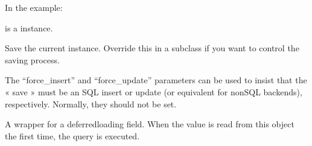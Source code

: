 \documentclass[letterpaper,10pt,french]{sphinxmanual}
\begin{document}
\begin{fulllineitems}
\begin{fulllineitems}
\sphinxAtStartPar
In the example:

\begin{sphinxVerbatim}[commandchars=\\\{\}]
 
       
\end{sphinxVerbatim}

\sphinxAtStartPar
{} is a  instance.

\end{fulllineitems}


\begin{fulllineitems}
\label{\detokenize{main/model:main.models.Conge.personnel_id}}
\pysigstartsignatures
{}
\pysigstopsignatures
\end{fulllineitems}


\begin{fulllineitems}
\label{\detokenize{main/model:main.models.Conge.save}}
\pysigstartsignatures
{}
\pysigstopsignatures
\sphinxAtStartPar
Save the current instance. Override this in a subclass if you want to
control the saving process.

\sphinxAtStartPar
The “force\_insert” and “force\_update” parameters can be used to insist
that the « save » must be an SQL insert or update (or equivalent for
non\sphinxhyphen{}SQL backends), respectively. Normally, they should not be set.

\end{fulllineitems}


\begin{fulllineitems}
\label{\detokenize{main/model:main.models.Conge.valider}}
\pysigstartsignatures
{}
\pysigstopsignatures
\sphinxAtStartPar
A wrapper for a deferred\sphinxhyphen{}loading field. When the value is read from this
object the first time, the query is executed.

\end{fulllineitems}


\end{fulllineitems}
\end{document}
